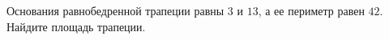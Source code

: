 \begin{ex}
	\begin{condition}
		Основания равнобедренной трапеции равны \( 3  \) и \( 13 \), а ее периметр равен \( 42 \). Найдите площадь трапеции.
	\end{condition}
\end{ex}